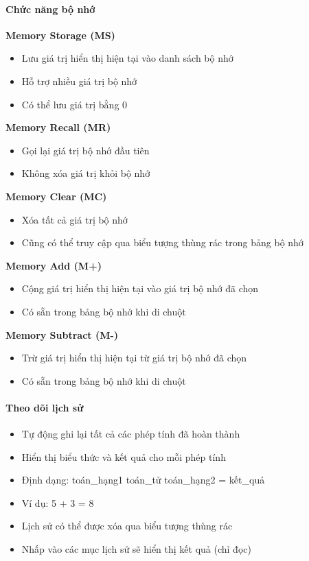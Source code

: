 \paragraph{Chức năng bộ nhớ}

\textbf{Memory Storage (MS)}
\begin{itemize}
    \item Lưu giá trị hiển thị hiện tại vào danh sách bộ nhớ
    \item Hỗ trợ nhiều giá trị bộ nhớ
    \item Có thể lưu giá trị bằng 0
\end{itemize}

\textbf{Memory Recall (MR)}
\begin{itemize}
    \item Gọi lại giá trị bộ nhớ đầu tiên
    \item Không xóa giá trị khỏi bộ nhớ
\end{itemize}

\textbf{Memory Clear (MC)}
\begin{itemize}
    \item Xóa tất cả giá trị bộ nhớ
    \item Cũng có thể truy cập qua biểu tượng thùng rác trong bảng bộ nhớ
\end{itemize}

\textbf{Memory Add (M+)}
\begin{itemize}
    \item Cộng giá trị hiển thị hiện tại vào giá trị bộ nhớ đã chọn
    \item Có sẵn trong bảng bộ nhớ khi di chuột
\end{itemize}

\textbf{Memory Subtract (M-)}
\begin{itemize}
    \item Trừ giá trị hiển thị hiện tại từ giá trị bộ nhớ đã chọn
    \item Có sẵn trong bảng bộ nhớ khi di chuột
\end{itemize}

\paragraph{Theo dõi lịch sử}

\begin{itemize}
    \item Tự động ghi lại tất cả các phép tính đã hoàn thành
    \item Hiển thị biểu thức và kết quả cho mỗi phép tính
    \item Định dạng: toán\_hạng1 toán\_tử toán\_hạng2 = kết\_quả
    \item Ví dụ: 5 + 3 = 8
    \item Lịch sử có thể được xóa qua biểu tượng thùng rác
    \item Nhấp vào các mục lịch sử sẽ hiển thị kết quả (chỉ đọc)
\end{itemize}

